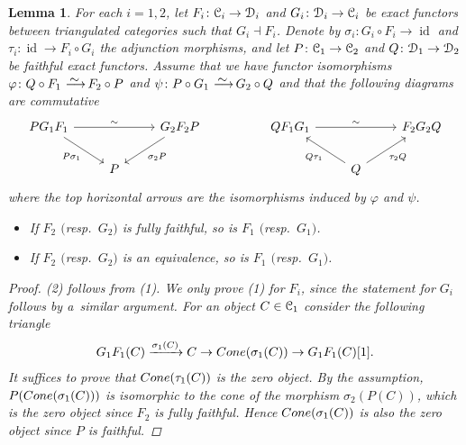 \documentclass[11pt]{article}
\numberwithin{equation}{section}
\newtheorem{lem}[dfn]{Lemma}
\numberwithin{equation}{section}
\newcommand{\id}{\operatorname{id}}
\newcommand{\scrC}{\EuScript{C}}
\newcommand{\scrD}{\EuScript{D}}
\newcommand{\simto}{\,\,\,\,\raisebox{4pt}{$\sim$}{\kern -1.1em \longrightarrow}\,}
\begin{document}
\begin{lem}\label{reduction lemma}
For each $i=1,2$, let $F_i\colon \scrC_i\to \scrD_i$ and $G_i\colon \scrD_i\to \scrC_i$ be exact functors between triangulated categories such that $G_i\dashv F_i$. Denote by $\sigma_i\colon G_i\circ F_i\to \id$ and $\tau_i\colon \id\to F_i\circ G_i$ the adjunction morphisms, and let $P\colon \scrC_1\to \scrC_2$ and $Q\colon \scrD_1\to\scrD_2$ be faithful exact functors. Assume that we have functor isomorphisms $\varphi\colon Q\circ F_1\simto F_2\circ P$ and $\psi\colon P\circ G_1\simto G_2\circ Q$ and that the following diagrams are commutative
\[
\begin{tikzcd}
PG_1F_1\arrow[rr, "\sim"]\arrow[rd, "P\sigma_1"']&&G_2F_2P\arrow[ld, "\sigma_2P"]&&
QF_1G_1\arrow[rr, "\sim"]&&F_2G_2Q\\
&P&&&&Q\arrow[lu, "Q\tau_1"]\arrow[ru, "\tau_2Q"']&
\end{tikzcd}
\]
where the top horizontal arrows are the isomorphisms induced by $\varphi$ and $\psi$.
\begin{itemize}\itemsep=0pt
\item[$1.$] If $F_2$ $($resp.\ $G_2)$ is fully faithful, so is $F_1$ $($resp.\ $G_1)$.
\item[$2.$] If $F_2$ $($resp.\ $G_2)$ is an equivalence, so is $F_1$ $($resp.\ $G_1)$.
\end{itemize}
\begin{proof}
(2) follows from (1). We only prove (1) for $F_i$, since the statement for $G_i$ follows by a~simi\-lar argument. For an object $C\in \scrC_1$ consider the following triangle
\begin{gather*}
 G_1F_1(C)\xrightarrow{\sigma_1(C)} C\to{\rm Cone}(\sigma_1(C))\to G_1F_1(C)[1].
\end{gather*}
It suffices to prove that ${\rm Cone}(\tau_1(C))$ is the zero object. By the assumption, $P({\rm Cone}(\sigma_1(C)))$ is isomorphic to the cone of the morphism $\sigma_2(P(C))$, which is the zero object since $F_2$ is fully faithful. Hence ${\rm Cone}(\sigma_1(C))$ is also the zero object since $P$ is faithful.
\end{proof}
\end{lem}
\end{document}
